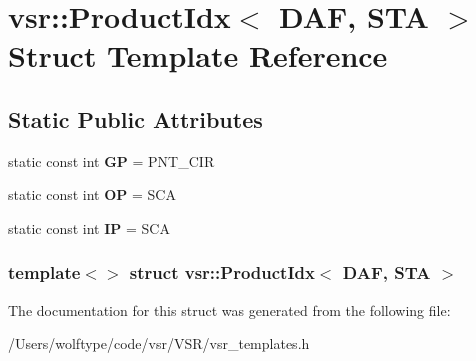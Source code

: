 \hypertarget{structvsr_1_1_product_idx_3_01_d_a_f_00_01_s_t_a_01_4}{\section{vsr\-:\-:Product\-Idx$<$ D\-A\-F, S\-T\-A $>$ Struct Template Reference}
\label{structvsr_1_1_product_idx_3_01_d_a_f_00_01_s_t_a_01_4}
}
\subsection*{Static Public Attributes}
\begin{DoxyCompactItemize}
\item 
\hypertarget{structvsr_1_1_product_idx_3_01_d_a_f_00_01_s_t_a_01_4_ac997c10243666b4060db7600da6d63fb}{static const int {\bfseries G\-P} = P\-N\-T\-\_\-\-C\-I\-R}\label{structvsr_1_1_product_idx_3_01_d_a_f_00_01_s_t_a_01_4_ac997c10243666b4060db7600da6d63fb}

\item 
\hypertarget{structvsr_1_1_product_idx_3_01_d_a_f_00_01_s_t_a_01_4_afdaa56aff2221f1249ca89888df2b8f4}{static const int {\bfseries O\-P} = S\-C\-A}\label{structvsr_1_1_product_idx_3_01_d_a_f_00_01_s_t_a_01_4_afdaa56aff2221f1249ca89888df2b8f4}

\item 
\hypertarget{structvsr_1_1_product_idx_3_01_d_a_f_00_01_s_t_a_01_4_ab1976fb7f3e62769ac42b78ae32db495}{static const int {\bfseries I\-P} = S\-C\-A}\label{structvsr_1_1_product_idx_3_01_d_a_f_00_01_s_t_a_01_4_ab1976fb7f3e62769ac42b78ae32db495}

\end{DoxyCompactItemize}
\subsubsection*{template$<$$>$ struct vsr\-::\-Product\-Idx$<$ D\-A\-F, S\-T\-A $>$}



The documentation for this struct was generated from the following file\-:\begin{DoxyCompactItemize}
\item 
/\-Users/wolftype/code/vsr/\-V\-S\-R/vsr\-\_\-templates.\-h\end{DoxyCompactItemize}
